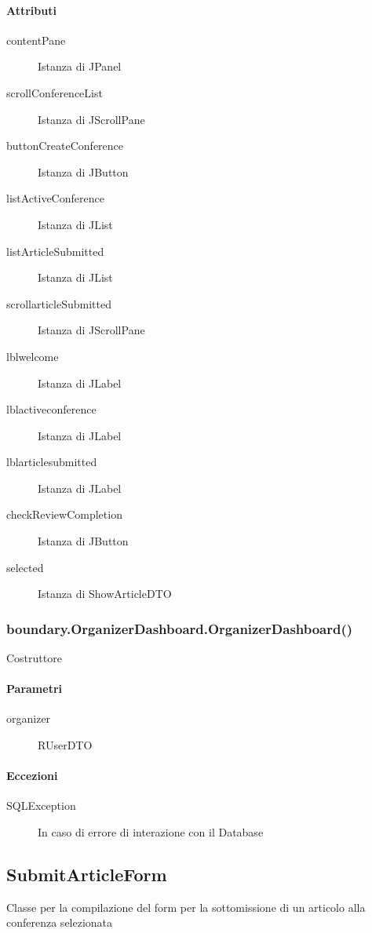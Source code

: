 \paragraph{Attributi}
\begin{description}
\item[contentPane] Istanza di JPanel
\item[scrollConferenceList] Istanza di JScrollPane
\item[buttonCreateConference] Istanza di JButton
\item[listActiveConference] Istanza di JList
\item[listArticleSubmitted] Istanza di JList
\item[scrollarticleSubmitted] Istanza di JScrollPane
\item[lblwelcome] Istanza di JLabel
\item[lblactiveconference] Istanza di JLabel
\item[lblarticlesubmitted] Istanza di JLabel
\item[checkReviewCompletion] Istanza di JButton
\item[selected] Istanza di ShowArticleDTO
\end{description}

\subsubsection{boundary.OrganizerDashboard.OrganizerDashboard()}
Costruttore
\paragraph{Parametri}
\begin{description}
\item[organizer] RUserDTO
\end{description}
\paragraph{Eccezioni}
\begin{description}
\item[SQLException] In caso di errore di interazione con il Database
\end{description}
\subsection{SubmitArticleForm}
Classe per la compilazione del form per la sottomissione di un articolo alla conferenza selezionata
